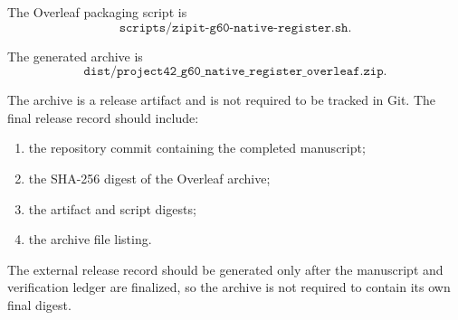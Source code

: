 The Overleaf packaging script is
\[
\texttt{scripts/zipit-g60-native-register.sh}.
\]

The generated archive is
\[
\texttt{dist/project42\_g60\_native\_register\_overleaf.zip}.
\]

The archive is a release artifact and is not required to be tracked in
Git. The final release record should include:

\begin{enumerate}
    \item the repository commit containing the completed manuscript;
    \item the SHA-256 digest of the Overleaf archive;
    \item the artifact and script digests;
    \item the archive file listing.
\end{enumerate}

The external release record should be generated only after the
manuscript and verification ledger are finalized, so the archive is
not required to contain its own final digest.
